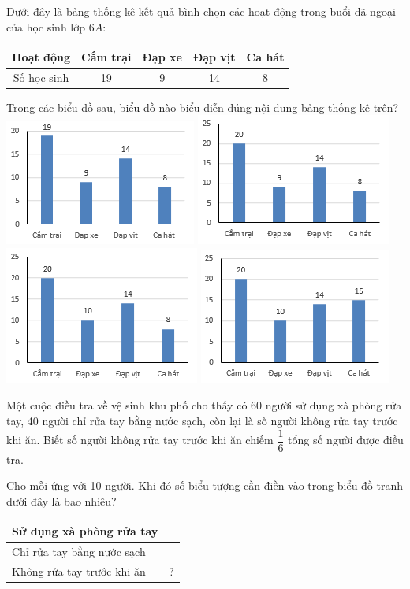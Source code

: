 \begin{ex}
	Dưới đây là bảng thống kê kết quả bình chọn các hoạt động trong buổi dã ngoại của học sinh lớp $6A$:
	\begin{center}
		\begin{tabular}{|c|c|c|c|c|}
			\hline
			Hoạt động&	Cắm trại&	Đạp xe&	Đạp vịt&	Ca hát\\
			\hline
			Số học sinh&  	19&	9&	14&	8\\
			\hline
		\end{tabular}
	\end{center}
	Trong các biểu đồ sau, biểu đồ nào biểu diễn đúng nội dung bảng thống kê trên?
	\choice
	{\includegraphics[width=0.3\linewidth]{22a}}
	{\includegraphics[width=0.3\linewidth]{22b}}
	{\includegraphics[width=0.3\linewidth]{22c}}
	{\includegraphics[width=0.3\linewidth]{22d}}
\end{ex}
\begin{ex}
	Một cuộc điều tra về vệ sinh khu phố cho thấy có 60 người sử dụng xà phòng rửa tay, 40 người chỉ rửa tay bằng nước sạch, còn lại là số người không rửa tay trước khi ăn. Biết số người không rửa  tay trước khi ăn chiếm  $\dfrac{1}{6}$ tổng số người được điều tra.
	
	Cho mỗi   ứng với 10 người. Khi đó số biểu tượng   cần điền vào trong biểu đồ tranh dưới đây là bao nhiêu?
	\begin{center}
		\begin{tabular}{|l|l|}
			\hline
			Sử dụng xà phòng rửa tay& \\
			\hline	      
			Chỉ rửa tay bằng nước sạch& \\
			\hline	    
			Không rửa tay trước khi ăn	&?\\
			\hline
		\end{tabular}
	\end{center}
\end{ex}
